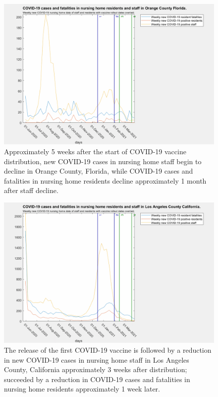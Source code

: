 \documentclass[twoside]{article}
\begin{document}
\begin{multicols}{2}
\begin{figure}[H]
	\includegraphics[width=\linewidth]{images/orange_nursing_home_with_vaccine.png}
	\caption{Approximately 5 weeks after the start of COVID-19 vaccine distribution, new COVID-19 cases in nursing home staff begin to decline in Orange County, Florida, while COVID-19 cases and fatalities in nursing home residents decline approximately 1 month after staff decline. }
	\label{fig:images/orange_nursing_home_with_vaccineLabel}
\end{figure}

\begin{figure}[H]
	\includegraphics[width=\linewidth]{images/losangeles_nursing_home_with_vaccine.png}
	\caption{The release of the first COVID-19 vaccine is followed by a reduction in new COVID-19 cases in nursing home staff in Los Angeles County, California approximately 3 weeks after distribution; succeeded by a reduction in COVID-19 cases and fatalities in nursing home residents approximately 1 week later. }
	\label{fig:images/losangeles_nursing_home_with_vaccineLabel}
\end{figure}


\end{multicols}
\end{document}
